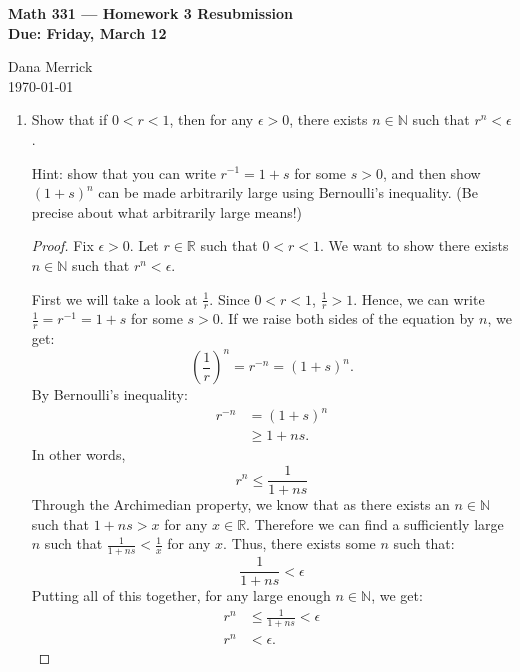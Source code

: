 \documentclass[12pt]{amsart}
\begin{document}
\thispagestyle{empty}

\begin{center}
{\bf Math 331  --- Homework 3 Resubmission \\
Due:  Friday, March 12}
\end{center}

\bigskip

\noindent
Dana Merrick \\
\today

\bigskip

\begin{enumerate}

\setlength{\itemsep}{6pt}

\addtocounter{enumi}{2}


\item Show that if $0<r<1$, then for any $\epsilon>0$, there exists $n\in \mathbb{N}$ such that $r^n<\epsilon$.  

Hint:  show that you can write $r^{-1}= 1+s$ for some $s>0$, and then show $(1+s)^n$ can be made arbitrarily large using Bernoulli's inequality.  (Be precise about what arbitrarily large means!)
\begin{proof}
Fix $\epsilon >0$. Let $r\in\mathbb R$ such that $0<r<1$. We want to show there exists $n\in \mathbb{N}$ such that $r^n<\epsilon$.

First we will take a look at $\frac 1 r$. Since $0<r<1$, $\frac 1 r > 1$. Hence, we can write $\frac 1 r = r^{-1} = 1+s$ for some $s>0$. If we raise both sides of the equation by $n$, we get:
\[ \left(\frac 1 r \right)^n = r^{-n} = (1+s)^n. \]
By Bernoulli's inequality:
\begin{align*}
r^{-n} &= (1+s)^n \\
&\ge 1+ns.
\end{align*}
In other words,
\[ 
r^n \le \frac 1 {1+ns}
\]
Through the Archimedian property, we know that as there exists an $n\in\mathbb N$ such that $1+ns>x$ for any $x\in\mathbb R$. Therefore we can find a sufficiently large $n$ such that $\frac 1 {1+ns}<\frac 1 x$ for any $x$. Thus, there exists some $n$ such that:
\[ \frac 1 {1+ns} < \epsilon \]
Putting all of this together, for any large enough $n\in\mathbb N$, we get:
\begin{align*}
r^n &\le \frac 1 {1+ns} < \epsilon \\
r^n &< \epsilon.
\end{align*}
\end{proof}

\addtocounter{enumi}{1}


\end{enumerate}
\end{document}
